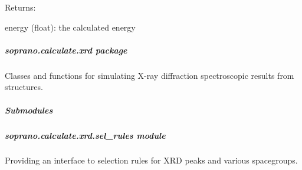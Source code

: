 \documentclass[letterpaper,10pt,english]{sphinxmanual}
\begin{document}
\begin{fulllineitems}
\begin{DUlineblock}{0em}
\item[] Returns:
\item[]
\begin{DUlineblock}{\DUlineblockindent}
\item[] energy (float): the calculated energy
\end{DUlineblock}
\end{DUlineblock}

\end{fulllineitems}



\subparagraph{soprano.calculate.xrd package}
\label{doctree/soprano.calculate.xrd:soprano-calculate-xrd-package}\label{doctree/soprano.calculate.xrd::doc}\label{doctree/soprano.calculate.xrd:module-soprano.calculate.xrd}
Classes and functions for simulating X-ray diffraction
spectroscopic results from structures.


\subparagraph{Submodules}
\label{doctree/soprano.calculate.xrd:submodules}

\subparagraph{soprano.calculate.xrd.sel\_rules module}
\label{doctree/soprano.calculate.xrd.sel_rules::doc}\label{doctree/soprano.calculate.xrd.sel_rules:module-soprano.calculate.xrd.sel_rules}\label{doctree/soprano.calculate.xrd.sel_rules:soprano-calculate-xrd-sel-rules-module}
Providing an interface to selection rules for XRD peaks and various
spacegroups.
\end{document}
